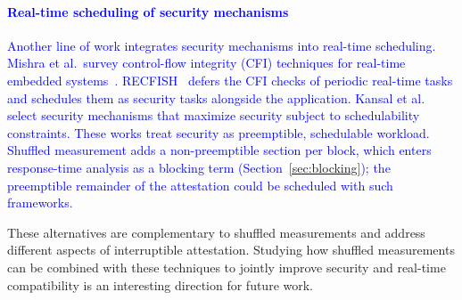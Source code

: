 \documentclass[journal]{IEEEtran}
\newcommand\ben[1]{\textcolor{blue}{#1}}
\begin{document}
\paragraph{\ben{Real-time scheduling of security mechanisms}}
\ben{Another line of work integrates security mechanisms into real-time scheduling.
Mishra et al.\ survey control-flow integrity (CFI) techniques for real-time embedded systems~\cite{mishra2022survey}.
RECFISH~\cite{mishra2023procrastinating} defers the CFI checks of periodic real-time tasks and schedules them as security tasks alongside the application.
Kansal et al.~\cite{kansal2023integrated} select security mechanisms that maximize security subject to schedulability constraints.
These works treat security as preemptible, schedulable workload.
Shuffled measurement adds a non-preemptible section per block, which enters response-time analysis as a blocking term (Section~\ref{sec:blocking}); the preemptible remainder of the attestation could be scheduled with such frameworks.}


These alternatives are complementary to shuffled measurements and address different aspects of interruptible attestation.
Studying how shuffled measurements can be combined with these techniques to jointly improve security and real-time compatibility is an interesting direction for future work.
\end{document}
